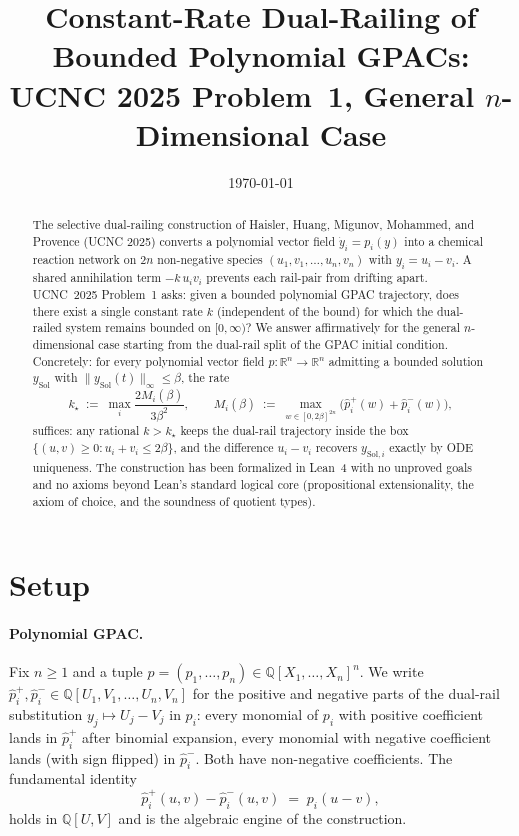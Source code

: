 \documentclass[11pt]{article}
\title{Constant-Rate Dual-Railing of Bounded Polynomial GPACs:\\
       UCNC 2025 Problem~1, General $n$-Dimensional Case}
\date{\today}
\newcommand{\R}{\mathbb{R}}
\newcommand{\Q}{\mathbb{Q}}
\newcommand{\evalu}{\widehat{p}^{+}}
\newcommand{\evalv}{\widehat{p}^{-}}
\newcommand{\norm}[1]{\lVert #1 \rVert}
\begin{document}
\maketitle

\begin{abstract}
The selective dual-railing construction of Haisler, Huang, Migunov,
Mohammed, and Provence (UCNC 2025) converts a polynomial vector field
$\dot y_i = p_i(y)$ into a chemical reaction network on
$2n$ non-negative species $(u_1, v_1, \dots, u_n, v_n)$ with
$y_i = u_i - v_i$.  A shared annihilation term $-k\,u_i v_i$ prevents
each rail-pair from drifting apart.  UCNC~2025 Problem~1 asks: given a
bounded polynomial GPAC trajectory, does there exist a single constant
rate $k$ (independent of the bound) for which the dual-railed system
remains bounded on $[0, \infty)$?  We answer affirmatively for the
general $n$-dimensional case starting from the dual-rail split of the
GPAC initial condition.  Concretely: for every polynomial vector field
$p\colon \R^n \to \R^n$ admitting a bounded solution $y_{\mathrm{Sol}}$
with $\norm{y_{\mathrm{Sol}}(t)}_\infty \le \beta$, the rate
\[
  k_\star \;:=\; \max_i \frac{2 M_i(\beta)}{3\beta^2},
  \qquad
  M_i(\beta) \;:=\; \max_{w \in [0, 2\beta]^{2n}}
                    \bigl(\evalu_i(w) + \evalv_i(w)\bigr),
\]
suffices: any rational $k > k_\star$ keeps the dual-rail trajectory
inside the box $\{(u,v) \ge 0 : u_i + v_i \le 2\beta\}$, and the
difference $u_i - v_i$ recovers $y_{\mathrm{Sol}, i}$ exactly by ODE
uniqueness.  The construction has been formalized in Lean~4 with no
unproved goals and no axioms beyond Lean's standard logical core
(propositional extensionality, the axiom of choice, and the soundness
of quotient types).
\end{abstract}

\section{Setup}

\paragraph{Polynomial GPAC.}
Fix $n \ge 1$ and a tuple
$p = (p_1, \dots, p_n) \in \Q[X_1, \dots, X_n]^n$.  We write
$\widehat{p}_i^{+}, \widehat{p}_i^{-} \in \Q[U_1, V_1, \dots, U_n, V_n]$
for the positive and negative parts of the dual-rail substitution
$y_j \mapsto U_j - V_j$ in $p_i$: every monomial of $p_i$ with positive
coefficient lands in $\widehat{p}_i^{+}$ after binomial expansion, every
monomial with negative coefficient lands (with sign flipped) in
$\widehat{p}_i^{-}$.  Both have non-negative coefficients.  The
fundamental identity
\begin{equation}\label{eq:diff-id}
  \widehat{p}_i^{+}(u, v) - \widehat{p}_i^{-}(u, v)
    \;=\; p_i(u - v),
\end{equation}
holds in $\Q[U, V]$ and is the algebraic engine of the construction.
\end{document}
